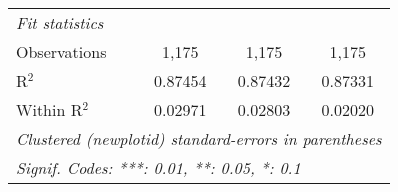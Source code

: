 \begin{table}[htbp]
\begin{tabular}{lccc}
      \midrule
      \emph{Fit statistics}\\
      Observations                   & 1,175           & 1,175           & 1,175\\  
      R$^2$                          & 0.87454         & 0.87432         & 0.87331\\  
      Within R$^2$                   & 0.02971         & 0.02803         & 0.02020\\  
      \midrule \midrule
      \multicolumn{4}{l}{\emph{Clustered (newplotid) standard-errors in parentheses}}\\
      \multicolumn{4}{l}{\emph{Signif. Codes: ***: 0.01, **: 0.05, *: 0.1}}\\
   \end{tabular}
\end{table}


